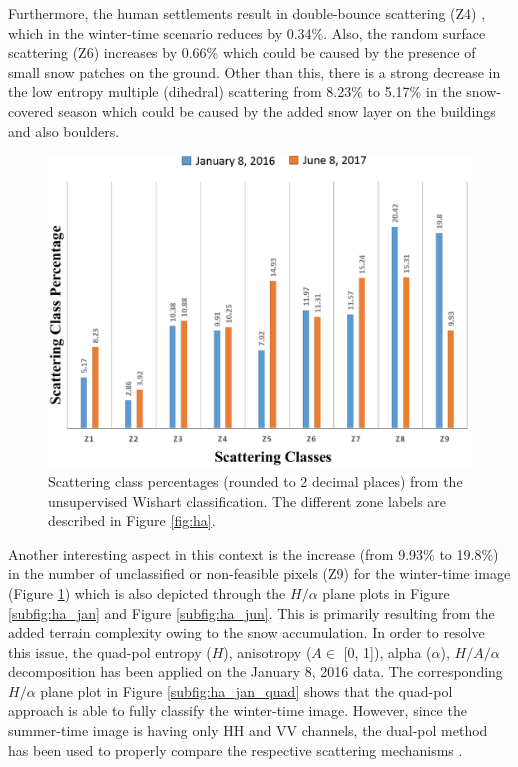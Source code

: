 \documentclass[12pt]{elsarticle}
\numberwithin{equation}{section}
\numberwithin{figure}{section}
\numberwithin{table}{section}
\begin{document}
Furthermore, the human settlements result in double-bounce scattering (Z4) \citep{Brunner2009}, which in the winter-time scenario reduces by 0.34\%. Also, the random surface scattering (Z6) increases by 0.66\% which could be caused by the presence of small snow patches on the ground. Other than this, there is a strong decrease in the low entropy multiple (dihedral) scattering from 8.23\% to 5.17\% in the snow-covered season which could be caused by the added snow layer on the buildings and also boulders.

\begin{figure}[htb]
    \centering
    \includegraphics[width=\textwidth]{Figures/Results/Percent.png}
    \caption{Scattering class percentages (rounded to 2 decimal places) from the unsupervised Wishart classification. The different zone labels are described in Figure \ref{fig:ha}.}
    \label{fig:percent}
\end{figure}

Another interesting aspect in this context is the increase (from 9.93\% to 19.8\%) in the number of unclassified or non-feasible pixels (Z9) for the winter-time image (Figure \ref{fig:percent}) which is also depicted through the $H/{\alpha}$ plane plots in Figure \ref{subfig:ha_jan} and Figure \ref{subfig:ha_jun}. This is primarily resulting from the added terrain complexity owing to the snow accumulation. In order to resolve this issue, the quad-pol entropy ($H$), anisotropy ($A \in$ [0, 1]), alpha ($\alpha$), $H/A/{\alpha}$ decomposition has been applied on the January 8, 2016 data. The corresponding $H/{\alpha}$ plane plot in Figure \ref{subfig:ha_jan_quad} shows that the quad-pol approach is able to fully classify the winter-time image. However, since the summer-time image is having only HH and VV channels, the dual-pol method has been used to properly compare the respective scattering mechanisms \citep{Majumdar2019}.
\end{document}
